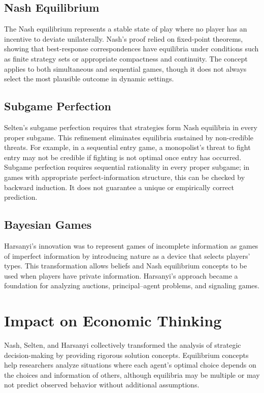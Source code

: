 \subsection*{Nash Equilibrium}
The Nash equilibrium represents a stable state of play where no player has an
incentive to deviate unilaterally. Nash's proof relied on fixed-point theorems,
showing that best-response correspondences have equilibria under conditions
such as finite strategy sets or appropriate compactness and continuity.
The concept applies to both simultaneous and sequential games, though it does
not always select the most plausible outcome in dynamic settings.

\subsection*{Subgame Perfection}
Selten's subgame perfection requires that strategies form Nash equilibria in
every proper subgame. This refinement eliminates equilibria sustained by
non-credible threats. For example, in a sequential entry game, a monopolist's
threat to fight entry may not be credible if fighting is not optimal once entry
has occurred. Subgame perfection requires sequential rationality in every
proper subgame; in games with appropriate perfect-information structure, this
can be checked by backward induction. It does not guarantee a unique or
empirically correct prediction.

\subsection*{Bayesian Games}
Harsanyi's innovation was to represent games of incomplete information as
games of imperfect information by introducing nature as a device that selects
players' types. This transformation allows beliefs and Nash equilibrium
concepts to be used when players have private information. Harsanyi's approach
became a foundation for analyzing auctions, principal--agent problems, and
signaling games.

\section{Impact on Economic Thinking}
Nash, Selten, and Harsanyi collectively transformed the analysis of strategic
decision-making by providing rigorous solution concepts. Equilibrium concepts
help researchers analyze situations where each agent's optimal choice depends
on the choices and information of others, although equilibria may be multiple
or may not predict observed behavior without additional assumptions.

